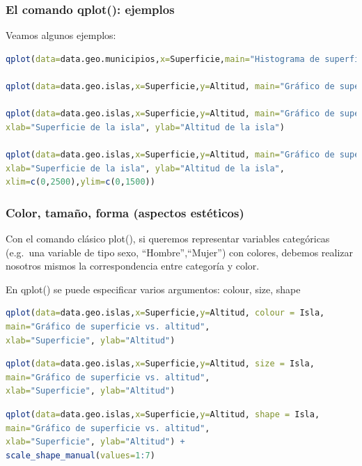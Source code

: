 \documentclass[8pt,ignorenonframetext,]{beamer}
\begin{document}
\begin{frame}[fragile]\frametitle{El comando qplot(): ejemplos}

Veamos algunos ejemplos:

\begin{lstlisting}[language=R]
qplot(data=data.geo.municipios,x=Superficie,main="Histograma de superficie",binwidth=50)

qplot(data=data.geo.islas,x=Superficie,y=Altitud, main="Gráfico de superficie vs. altitud")

qplot(data=data.geo.islas,x=Superficie,y=Altitud, main="Gráfico de superficie vs. altitud", 
xlab="Superficie de la isla", ylab="Altitud de la isla")

qplot(data=data.geo.islas,x=Superficie,y=Altitud, main="Gráfico de superficie vs. altitud", 
xlab="Superficie de la isla", ylab="Altitud de la isla",
xlim=c(0,2500),ylim=c(0,1500))
\end{lstlisting}

\end{frame}

\begin{frame}[fragile]\frametitle{Color, tamaño, forma (aspectos
estéticos)}

Con el comando clásico plot(), si queremos representar variables
categóricas (e.g.~una variable de tipo sexo, ``Hombre'',``Mujer'') con
colores, debemos realizar nosotros mismos la correspondencia entre
categoría y color.

En qplot() se puede especificar varios argumentos: colour, size, shape

\begin{lstlisting}[language=R]
qplot(data=data.geo.islas,x=Superficie,y=Altitud, colour = Isla,
main="Gráfico de superficie vs. altitud", 
xlab="Superficie", ylab="Altitud") 
\end{lstlisting}

\begin{lstlisting}[language=R]
qplot(data=data.geo.islas,x=Superficie,y=Altitud, size = Isla,
main="Gráfico de superficie vs. altitud", 
xlab="Superficie", ylab="Altitud") 
\end{lstlisting}

\begin{lstlisting}[language=R]
qplot(data=data.geo.islas,x=Superficie,y=Altitud, shape = Isla,
main="Gráfico de superficie vs. altitud", 
xlab="Superficie", ylab="Altitud") +
scale_shape_manual(values=1:7)
\end{lstlisting}

\end{frame}
\end{document}
